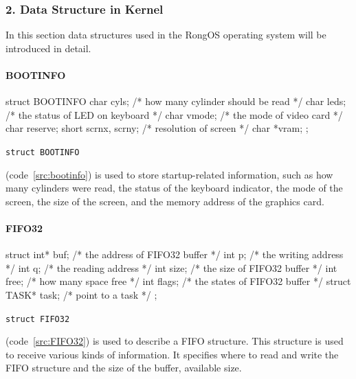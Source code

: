 \documentclass{swfcthesis}
\begin{document}
\subsubsection{2. Data Structure in Kernel}
In this section data structures used in the RongOS operating system will be introduced in
detail.

\paragraph{BOOTINFO}

\begin{listing}[H]
  \begin{codeblock}
\begin{ccode}
struct BOOTINFO
{
  char cyls;          /* how many cylinder should be read */
  char leds;          /* the status of LED on keyboard */
  char vmode;         /* the mode of video card */
  char reserve;
  short scrnx, scrny; /* resolution of screen */
  char *vram;
};
\end{ccode}
  \end{codeblock}
  \caption{\texttt{struct BOOTINFO}}\label{src:bootinfo}
\end{listing}

(code~\ref{src:bootinfo}) is used to store startup-related
information, such as how many cylinders were read, the status of the keyboard indicator,
the mode of the screen, the size of the screen, and the memory address of the graphics
card.


\paragraph{FIFO32}

\begin{listing}[H]
  \begin{codeblock}
\begin{ccode}
struct 
{ 
  int* buf;          /* the address of FIFO32 buffer */
  int p;             /* the writing address */
  int q;             /* the reading address */
  int size;          /* the size of FIFO32 buffer */
  int free;          /* how many space free */
  int flags;         /* the states of FIFO32 buffer */
  struct TASK* task; /* point to a task */ 
};
\end{ccode}
  \end{codeblock}
  \caption{\texttt{struct FIFO32}}\label{src:FIFO32}
\end{listing}

(code~\ref{src:FIFO32}) is used to
describe a FIFO structure. This structure is used to receive various kinds of
information. It specifies where to read and write the FIFO structure and the size of the
buffer, available size.
\end{document}
